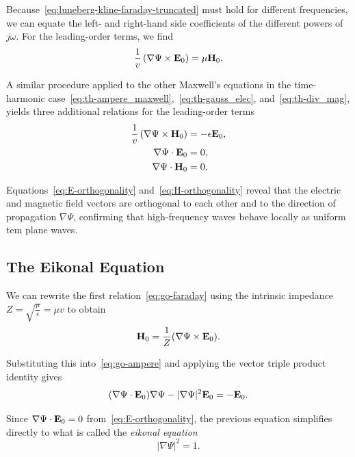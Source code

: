 Because~\eqref{eq:luneberg-kline-faraday-truncated} must hold for different frequencies, we can equate the left- and right-hand side coefficients of the different powers of $j\omega$. For the leading-order terms, we find
\begin{equation}
  \frac{1}{v}\left(\nabla \Psi \times \mathbf{E}_0\right) = \mu \mathbf{H}_0.\label{eq:go-faraday}
\end{equation}

A similar procedure applied to the other Maxwell's equations in the time-harmonic case~\eqref{eq:th-ampere_maxwell},~\eqref{eq:th-gauss_elec}, and~\eqref{eq:th-div_mag}, yields three additional relations for the leading-order terms
\begin{align}
  \frac{1}{v}\left(\nabla \Psi \times \mathbf{H}_0\right) &= -\epsilon \mathbf{E}_0,\label{eq:go-ampere}\\
  \nabla \Psi \cdot \mathbf{E}_0 &= 0,\label{eq:E-orthogonality}\\
  \nabla \Psi \cdot \mathbf{H}_0 &= 0.\label{eq:H-orthogonality}
\end{align}

Equations~\eqref{eq:E-orthogonality} and~\eqref{eq:H-orthogonality} reveal that the electric and magnetic field vectors are orthogonal to each other and to the direction of propagation $\nabla \Psi$, confirming that high-frequency waves behave locally as uniform \gls{tem} plane waves.

\subsection{The Eikonal Equation}

We can rewrite the first relation~\eqref{eq:go-faraday} using the intrinsic impedance $Z = \sqrt{\tfrac{\mu}{\epsilon}} = \mu v$ to obtain
\begin{equation}
  \mathbf{H}_0 = \frac{1}{Z} (\nabla \Psi \times \mathbf{E}_0).
\end{equation}

Substituting this into~\eqref{eq:go-ampere} and applying the vector triple product identity gives
\begin{equation}
  (\nabla \Psi \cdot \mathbf{E}_0) \nabla \Psi - |\nabla \Psi|^2 \mathbf{E}_0 = -\mathbf{E}_0.
\end{equation}

Since $\nabla \Psi \cdot \mathbf{E}_0 = 0$ from~\eqref{eq:E-orthogonality}, the previous equation simplifies directly to what is called the \emph{eikonal equation}
\begin{equation}\label{eq:eikonal}
  |\nabla \Psi|^2 = 1.
\end{equation}

